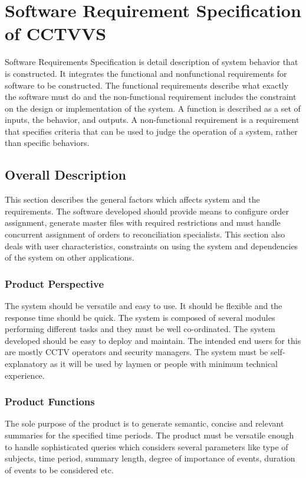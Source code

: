 \chapter{Software Requirement Specification of CCTVVS}

Software Requirements Specification is detail description of system behavior
that is constructed. It integrates the functional and nonfunctional requirements
for software to be constructed. The functional requirements describe what
exactly the software must do and the non-functional requirement includes the
constraint on the design or implementation of the system. A function is
described as a set of inputs, the behavior, and outputs. A non-functional
requirement is a requirement that specifies criteria that can be used to judge
the operation of a system, rather than specific behaviors.

\section{Overall Description}

This section describes the general factors which affects system and the
requirements. The software developed should provide means to configure order
assignment, generate master files with required restrictions and must handle
concurrent assignment of orders to reconciliation specialists. This section
also deals with user characteristics, constraints on using the system and
dependencies of the system on other applications.

    \subsection{Product Perspective}
    The system should be versatile and easy to use. It should be flexible and
    the response time should be quick. The system is composed of several modules
    performing different tasks and they must be well co-ordinated. The system
    developed should be easy to deploy and maintain. The intended end users for
    this are mostly CCTV operators and security managers. The system must be
    self-explanatory as it will be used by laymen or people with minimum
    technical experience.

    \subsection{Product Functions}
    The sole purpose of the product is to generate semantic, concise and
    relevant summaries for the specified time periods. The product must be
    versatile enough to handle sophisticated queries which considers several
    parameters like type of subjects, time period, summary length, degree of
    importance of events, duration of events to be considered etc.

